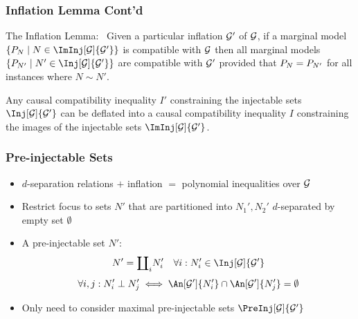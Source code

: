 \documentclass[
    hyperref={bookmarks=false},%
    xcolor={dvipsnames},
]{beamer}
\renewcommand{\term}[1]{\textcolor{Mahogany}{#1}}
\begin{document}
\begin{frame}
    \frametitle{Inflation Lemma Cont'd}
    \begin{lemma}
        \term{The Inflation Lemma:}~\cite[lemma 3]{Inflation} Given a particular inflation $\mathcal{G}'$ of $\mathcal{G}$, if a marginal model $\bc{\prob[N] \mid N \in \ImInj[\graph]{\graph'}}$ is compatible with $\mathcal{G}$ then all marginal models $\bc{\prob[N'] \mid N' \in \Inj[\graph]{\graph'}}$ are compatible with $\mathcal{G}'$ provided that $\prob[N] = \prob[N']$ for all instances where $N \sim N'$.
    \end{lemma}
    \begin{corollary}
        Any causal compatibility inequality $I'$ constraining the injectable sets $\Inj[\graph]{\graph'}$ can be \term{deflated} into a causal compatibility inequality $I$ constraining the images of the injectable sets $\ImInj[\graph]{\graph'}$.
    \end{corollary}
\end{frame}

\begin{frame}
    \frametitle{Pre-injectable Sets}
    \begin{itemize}
        \item $d$-separation relations $+$ inflation $=$ polynomial inequalities over $\mathcal{G}$
        \item Restrict focus to sets $N'$ that are partitioned into $N_1', N_2'$ $d$-separated by empty set $\emptyset$
        \item A \term{pre-injectable set} $N'$:
        \[ N' = {\coprod}_i N_i' \quad \forall i: N_i' \in \Inj[\graph]{\graph'} \]
        \[ \forall i, j : N_i' \ancestralindep N_j' \iff \An[\graph']{N'_i} \cap \An[\graph']{N'_j} = \emptyset \]
        \item Only need to consider \term{maximal pre-injectable sets} $\PreInj[\graph]{\graph'}$
    \end{itemize}
\end{frame}
\end{document}
